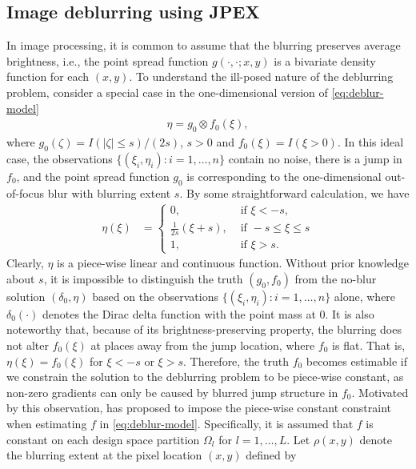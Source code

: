 \subsection{Image deblurring using JPEX}\label{sec:deblur.jpex}

In image processing, it is common to assume that the blurring preserves average brightness, i.e., the point spread function \(g(\cdot, \cdot; x,y)\) is a bivariate density function for each \((x,y)\). To understand the ill-posed nature of the deblurring problem, consider a special case in the one-dimensional version of \eqref{eq:deblur-model}
\begin{align*}
  \eta = g_0 \otimes f_0(\xi), 
\end{align*}
where \(g_0(\zeta)=I(|\zeta| \leq s)/(2s)\), \(s>0\) and \(f_0(\xi)=I(\xi>0)\). In this ideal case, the observations \(\{(\xi_i, \eta_i): i=1,\ldots, n \}\) contain no noise, there is a jump in \(f_0\), and the point spread function \(g_0\) is corresponding to the one-dimensional out-of-focus blur with blurring extent \(s\). By some straightforward calculation, we have
\begin{align*}
  \eta(\xi) &= \begin{cases}
    0, & \text{ if } \xi < -s, \\
    \frac{1}{2s} (\xi + s), & \text{ if } -s \leq \xi \leq s \\
    1, & \text{ if } \xi > s. \end{cases}
\end{align*}
Clearly, \(\eta\) is a piece-wise linear and continuous function. Without prior knowledge about \(s\), it is impossible to distinguish the truth \((g_0, f_0)\) from the no-blur solution \((\delta_0, \eta)\) based on the observations \(\{(\xi_i, \eta_i): i=1,\ldots, n \}\) alone, where \(\delta_0(\cdot)\) denotes the Dirac delta function with the point mass at \(0\). It is also noteworthy that, because of its brightness-preserving property, the blurring does not alter \(f_0(\xi)\) at places away from the jump location, where \(f_0\) is flat. That is, \(\eta(\xi)=f_0(\xi)\) for \(\xi<-s\) or \(\xi>s\). Therefore, the truth \(f_0\) becomes estimable if we constrain the solution to the deblurring problem to be piece-wise constant, as non-zero gradients can only be caused by blurred jump structure in \(f_0\). Motivated by this observation, \citet{kang2020consistent} has proposed to impose the piece-wise constant constraint when estimating \(f\) in \eqref{eq:deblur-model}. Specifically, it is assumed that \(f\) is constant on each design space partition \(\Omega_l\) for \(l=1, \ldots, L\). Let \(\rho(x,y)\) denote the blurring extent at the pixel location \((x,y)\) defined by
